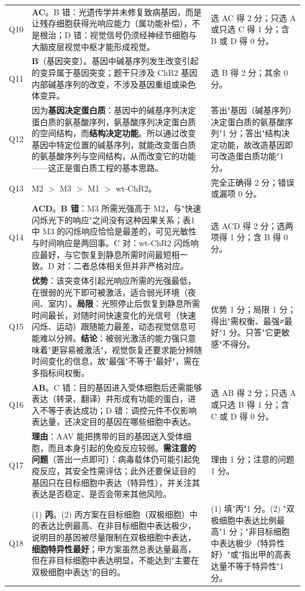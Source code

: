 \documentclass[UTF8,a4paper,11pt]{ctexart}
\begin{document}
\begin{longtable}{@{}p{0.85cm}p{9.7cm}p{4.2cm}@{}}
\addlinespace
Q10 & \textbf{AC}。B 错：光遗传学并未修复致病基因，而是让残存细胞获得光响应能力（属功能补偿），不是根治；D 错：视觉信号仍须经神经节细胞与大脑皮层视觉中枢才能形成视觉。 & 选 AC 得 2 分；只选 A 或只选 C 得 1 分；含 B 或 D 得 0 分。 \\
\addlinespace
Q11 & \textbf{B}（基因突变）。基因中碱基序列发生改变引起的变异属于基因突变；题干只涉及 ChR2 基因内部碱基序列的改变，不涉及基因重组或染色体变异。 & 选 B 得 2 分；其余 0 分。 \\
\addlinespace
Q12 & 因为\textbf{基因决定蛋白质}：基因中的碱基序列决定蛋白质的氨基酸序列，氨基酸序列决定蛋白质的空间结构，而\textbf{结构决定功能}。所以通过改变基因中特定位置的碱基序列，就能改变蛋白质的氨基酸序列与空间结构，从而改变它的功能——这正是蛋白质工程的基本思路。 & 答出"基因（碱基序列）决定蛋白质的氨基酸序列"1 分；答出"结构决定功能，故改造基因即可改造蛋白质功能"1 分。 \\
\addlinespace
Q13 & M2 $>$ M3 $>$ M1 $>$ wt-ChR2。 & 完全正确得 2 分；错误或漏项 0 分。 \\
\addlinespace
Q14 & \textbf{ACD}。\textbf{B 错}：M3 所需光强高于 M2，与"快速闪烁光下的响应"之间没有这种因果关系；表1 中 M3 的闪烁响应恰恰是最差的，可见光敏性与时间响应是两回事。C 对：wt-ChR2 闪烁响应最好，与它恢复到静息所需时间最短相一致。D 对：二者总体相关但并非严格对应。 & 选 ACD 得 2 分；选两项得 1 分；含 B 得 0 分。 \\
\addlinespace
Q15 & \textbf{优势}：该突变体引起光响应所需的光强最低，在很弱的光下即可被激活，适合弱光环境（夜间、室内）。\textbf{局限}：光照停止后恢复到静息所需时间最长，对随时间快速变化的光信号（快速闪烁、运动）跟随能力最差，动态视觉信息可能难以分辨。\textbf{结论}：被弱光激活的能力强只意味着"更容易被激活"，视觉恢复还要求能分辨随时间变化的信息，故"最强"不等于"最好"，需在多指标间权衡。 & 优势 1 分；局限 1 分；得出"需权衡、最强≠最好"1 分。只答"它更敏感"不得分。 \\
\addlinespace
Q16 & \textbf{AB}。C 错：目的基因进入受体细胞后还需能够表达（转录、翻译）并形成有功能的蛋白，进入不等于表达成功；D 错：调控元件不仅影响表达量，还决定目的基因在哪些细胞中表达。 & 选 AB 得 2 分；只选 A 或只选 B 得 1 分；含 C 或 D 得 0 分。 \\
\addlinespace
Q17 & \textbf{理由}：AAV 能把携带的目的基因送入受体细胞，而且本身引起的免疫反应较弱。\textbf{需注意的问题}（答出一点即可）：病毒载体仍可能引起免疫反应，其安全性需评估；此外还要保证目的基因只在目标细胞中表达（特异性），并关注其表达是否稳定、是否会带来其他风险。 & 理由 1 分；注意的问题 1 分。 \\
\addlinespace
Q18 & (1) \textbf{丙}。(2) 丙方案在目标细胞（双极细胞）中的表达比例最高、在非目标细胞中表达极少，说明目的基因被尽量限制在双极细胞中表达，\textbf{细胞特异性最好}；甲方案虽然总表达量最高，但在非目标细胞中表达明显，不能达到"主要在双极细胞中表达"的目的。 & (1) 填"丙"1 分。(2) "双极细胞中表达比例最高"1 分；"非目标细胞中表达极少（特异性好）"或"指出甲的高表达量不等于特异性"1 分。 \\

\end{longtable}
\end{document}
